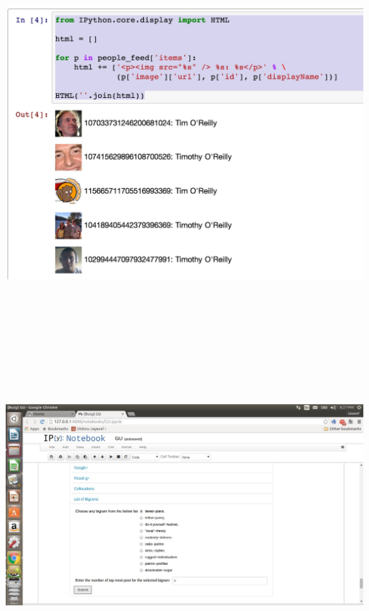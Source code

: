 \documentclass{mnnit}
\begin{document}
\includegraphics[width=175mm,height=140mm]{Screenshot3.jpg}
\vspace{2 mm}
\begin{center}
\cite{boole}
\end{center}

\vspace{120 mm}


\includegraphics[width=175mm,height=120mm]{Screenshot2.jpg}

\vspace{2 mm}
\begin{center}
\cite{ipythoninfo1}
\cite{ipythoninfo2}
\end{center}




\cite{boole}
\cite{ron}
\cite{nltk1}
\cite{nltk2}
\cite{nltk3}
\cite{ipythoninfo1}
\cite{ipythoninfo2}
\end{document}
